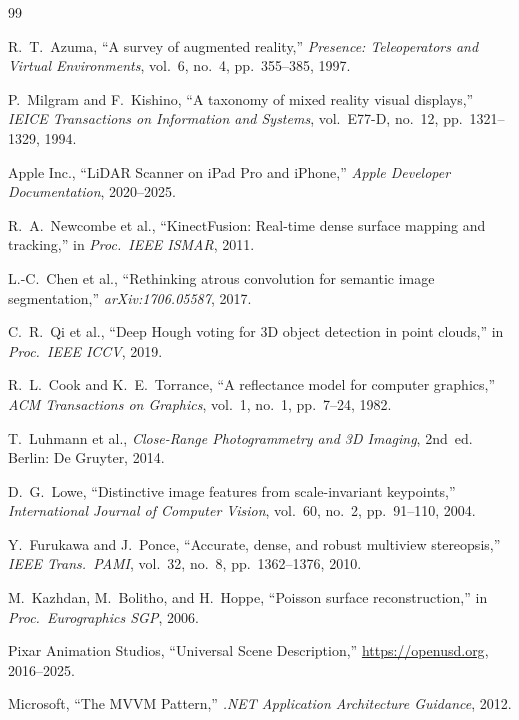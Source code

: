 \begin{thebibliography}{99}

R.~T.~Azuma, ``A survey of augmented reality,'' \textit{Presence: Teleoperators and Virtual Environments}, vol.~6, no.~4, pp.~355--385, 1997.

P.~Milgram and F.~Kishino, ``A taxonomy of mixed reality visual displays,'' \textit{IEICE Transactions on Information and Systems}, vol.~E77-D, no.~12, pp.~1321--1329, 1994.

Apple Inc., ``LiDAR Scanner on iPad Pro and iPhone,'' \textit{Apple Developer Documentation}, 2020--2025.

R.~A.~Newcombe et al., ``KinectFusion: Real-time dense surface mapping and tracking,'' in \textit{Proc.~IEEE ISMAR}, 2011.

L.-C.~Chen et al., ``Rethinking atrous convolution for semantic image segmentation,'' \textit{arXiv:1706.05587}, 2017.

C.~R.~Qi et al., ``Deep Hough voting for 3D object detection in point clouds,'' in \textit{Proc.~IEEE ICCV}, 2019.

R.~L.~Cook and K.~E.~Torrance, ``A reflectance model for computer graphics,'' \textit{ACM Transactions on Graphics}, vol.~1, no.~1, pp.~7--24, 1982.

T.~Luhmann et al., \textit{Close-Range Photogrammetry and 3D Imaging}, 2nd~ed. Berlin: De Gruyter, 2014.

D.~G.~Lowe, ``Distinctive image features from scale-invariant keypoints,'' \textit{International Journal of Computer Vision}, vol.~60, no.~2, pp.~91--110, 2004.

Y.~Furukawa and J.~Ponce, ``Accurate, dense, and robust multiview stereopsis,'' \textit{IEEE Trans.~PAMI}, vol.~32, no.~8, pp.~1362--1376, 2010.

M.~Kazhdan, M.~Bolitho, and H.~Hoppe, ``Poisson surface reconstruction,'' in \textit{Proc.~Eurographics SGP}, 2006.

Pixar Animation Studios, ``Universal Scene Description,'' \url{https://openusd.org}, 2016--2025.

Microsoft, ``The MVVM Pattern,'' \textit{.NET Application Architecture Guidance}, 2012.


\end{thebibliography}
